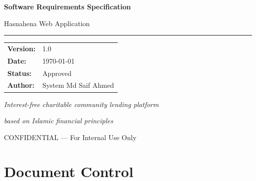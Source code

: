 \documentclass[11pt,a4paper]{article}
\newcommand{\DocumentTitle}{Software Requirements Specification}
\newcommand{\DocumentSubtitle}{Hasnahena Web Application}
\newcommand{\DocumentVersion}{1.0}
\newcommand{\DocumentDate}{\today}
\begin{document}
\begin{titlepage}
    \centering
    \vspace*{2cm}
    
    {\Huge\bfseries\color{primaryblue}\DocumentTitle\par}
    \vspace{0.5cm}
    {\LARGE\color{darkgray}\DocumentSubtitle\par}
    
    \vspace{1.5cm}
    
    {\color{primaryblue}\rule{10cm}{2pt}\par}
    
    \vspace{2cm}
    
    \begin{tabular}{ll}
        \textbf{Version:} & \DocumentVersion \\[0.5em]
        \textbf{Date:} & \DocumentDate \\[0.5em]
        \textbf{Status:} & Approved \\[0.5em]
        \textbf{Author:} & System Md Saif Ahmed \\[0.5em]
    \end{tabular}
    
    \vfill
    
    {\large\color{darkgray}\textit{Interest-free charitable community lending platform}\par}
    {\large\color{darkgray}\textit{based on Islamic financial principles}\par}
    
    \vspace{1cm}
    
    {\footnotesize\color{darkgray}CONFIDENTIAL --- For Internal Use Only\par}
\end{titlepage}

\tableofcontents
\newpage

\section*{Document Control}
\end{document}
